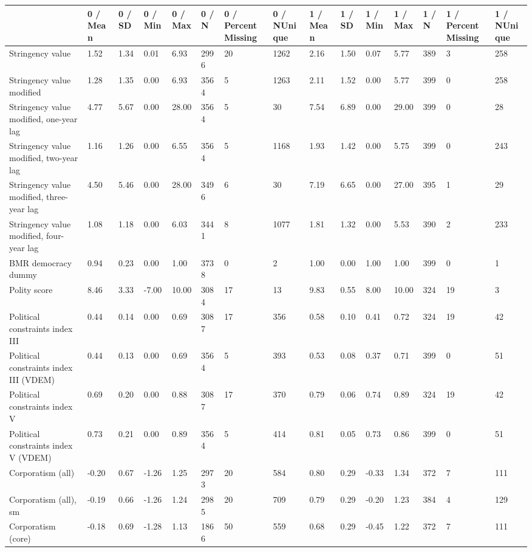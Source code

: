 
\begin{longtable}{lllllllllllllll}
\toprule
  & 0 / Mean & 0 / SD & 0 / Min & 0 / Max & 0 / N & 0 / PercentMissing & 0 / NUnique & 1 / Mean & 1 / SD & 1 / Min & 1 / Max & 1 / N & 1 / PercentMissing & 1 / NUnique\\
\midrule
Stringency value & 1.52 & 1.34 & 0.01 & 6.93 & 2996 & 20 & 1262 & 2.16 & 1.50 & 0.07 & 5.77 & 389 & 3 & 258\\
Stringency value modified & 1.28 & 1.35 & 0.00 & 6.93 & 3564 & 5 & 1263 & 2.11 & 1.52 & 0.00 & 5.77 & 399 & 0 & 258\\
Stringency value modified, one-year lag & 4.77 & 5.67 & 0.00 & 28.00 & 3564 & 5 & 30 & 7.54 & 6.89 & 0.00 & 29.00 & 399 & 0 & 28\\
Stringency value modified, two-year lag & 1.16 & 1.26 & 0.00 & 6.55 & 3564 & 5 & 1168 & 1.93 & 1.42 & 0.00 & 5.75 & 399 & 0 & 243\\
Stringency value modified, three-year lag & 4.50 & 5.46 & 0.00 & 28.00 & 3496 & 6 & 30 & 7.19 & 6.65 & 0.00 & 27.00 & 395 & 1 & 29\\
\addlinespace
Stringency value modified, four-year lag & 1.08 & 1.18 & 0.00 & 6.03 & 3441 & 8 & 1077 & 1.81 & 1.32 & 0.00 & 5.53 & 390 & 2 & 233\\
BMR democracy dummy & 0.94 & 0.23 & 0.00 & 1.00 & 3738 & 0 & 2 & 1.00 & 0.00 & 1.00 & 1.00 & 399 & 0 & 1\\
Polity score & 8.46 & 3.33 & -7.00 & 10.00 & 3084 & 17 & 13 & 9.83 & 0.55 & 8.00 & 10.00 & 324 & 19 & 3\\
Political constraints index III & 0.44 & 0.14 & 0.00 & 0.69 & 3087 & 17 & 356 & 0.58 & 0.10 & 0.41 & 0.72 & 324 & 19 & 42\\
Political constraints index III (VDEM) & 0.44 & 0.13 & 0.00 & 0.69 & 3564 & 5 & 393 & 0.53 & 0.08 & 0.37 & 0.71 & 399 & 0 & 51\\
\addlinespace
Political constraints index V & 0.69 & 0.20 & 0.00 & 0.88 & 3087 & 17 & 370 & 0.79 & 0.06 & 0.74 & 0.89 & 324 & 19 & 42\\
Political constraints index V (VDEM) & 0.73 & 0.21 & 0.00 & 0.89 & 3564 & 5 & 414 & 0.81 & 0.05 & 0.73 & 0.86 & 399 & 0 & 51\\
Corporatism (all) & -0.20 & 0.67 & -1.26 & 1.25 & 2973 & 20 & 584 & 0.80 & 0.29 & -0.33 & 1.34 & 372 & 7 & 111\\
Corporatism (all), sm & -0.19 & 0.66 & -1.26 & 1.24 & 2985 & 20 & 709 & 0.79 & 0.29 & -0.20 & 1.23 & 384 & 4 & 129\\
Corporatism (core) & -0.18 & 0.69 & -1.28 & 1.13 & 1866 & 50 & 559 & 0.68 & 0.29 & -0.45 & 1.22 & 372 & 7 & 111\\

\end{longtable}
